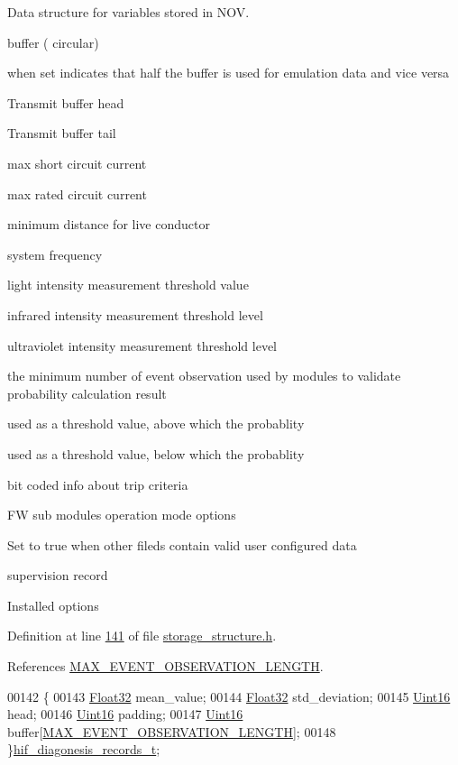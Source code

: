 Data structure for variables stored in N\+O\+V. 

buffer ( circular)

when set indicates that half the buffer is used for emulation data and vice versa

Transmit buffer head

Transmit buffer tail

max short circuit current

max rated circuit current

minimum distance for live conductor

system frequency

light intensity measurement threshold value

infrared intensity measurement threshold level

ultraviolet intensity measurement threshold level

the minimum number of event observation used by modules to validate probability calculation result

used as a threshold value, above which the probablity

used as a threshold value, below which the probablity

bit coded info about trip criteria

F\+W sub modules operation mode options

Set to true when other fileds contain valid user configured data

supervision record

Installed options 

Definition at line \hyperlink{a00003_source_l00141}{141} of file \hyperlink{a00003_source}{storage\+\_\+structure.\+h}.



References \hyperlink{a00003_source_l00032}{M\+A\+X\+\_\+\+E\+V\+E\+N\+T\+\_\+\+O\+B\+S\+E\+R\+V\+A\+T\+I\+O\+N\+\_\+\+L\+E\+N\+G\+T\+H}.


\begin{DoxyCode}
00142 \{
00143        \hyperlink{a00001_a87d38f886e617ced2698fc55afa07637}{Float32}                mean\_value;
00144        \hyperlink{a00001_a87d38f886e617ced2698fc55afa07637}{Float32}                std\_deviation;
00145        \hyperlink{a00001_aae7407b021d43f7193a81a58cfb3e297}{Uint16}                 head;
00146        \hyperlink{a00001_aae7407b021d43f7193a81a58cfb3e297}{Uint16}                 padding;
00147        \hyperlink{a00001_aae7407b021d43f7193a81a58cfb3e297}{Uint16}                 buffer[\hyperlink{a00003_aa060aeb1ecb530b3c6f6d91060999b70}{MAX\_EVENT\_OBSERVATION\_LENGTH}];
00148 \}\hyperlink{a00003_a4726b814166e222a6f13e21453f76d8d}{hif\_diagonesis\_records\_t};
\end{DoxyCode}


